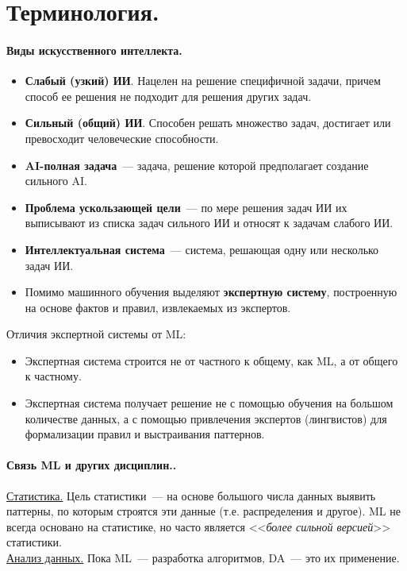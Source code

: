 \documentclass{article}
\begin{document}
    \section{Терминология.}
    \paragraph{Виды искусственного интеллекта.}
    \begin{itemize}
        \item \textbf{Слабый (узкий) ИИ}. Нацелен на решение специфичной задачи, причем способ ее решения не подходит для решения других задач.
        \item \textbf{Сильный (общий) ИИ}. Способен решать множество задач, достигает или превосходит человеческие способности.
        \item \textbf{AI-полная задача}~--- задача, решение которой предполагает создание сильного AI.
        \item \textbf{Проблема ускользающей цели}~--- по мере решения задач ИИ их выписывают из списка задач сильного ИИ и относят к задачам слабого ИИ.
        \item\textbf{Интеллектуальная система}~--- система, решающая одну или несколько задач ИИ.
        \item Помимо машинного обучения выделяют \textbf{экспертную систему}, построенную на основе фактов и правил, извлекаемых из экспертов.
    \end{itemize}
    Отличия экспертной системы от ML:
    \begin{itemize}
        \item Экспертная система строится не от частного к общему, как ML, а от общего к частному.
        \item Экспертная система получает решение не с помощью обучения на большом количестве данных, а с помощью привлечения экспертов (лингвистов) для формализации правил и выстраивания паттернов.
    \end{itemize}
    \paragraph{Связь ML и других дисциплин..}
    \underline{Статистика.} Цель статистики~--- на основе большого числа данных выявить паттерны, по которым строятся эти данные (т.е. распределения и другое). ML не всегда основано на статистике, но часто является <<\textit{более сильной версией}>> статистики.\\
    \underline{Анализ данных.} Пока ML~--- разработка алгоритмов, DA~--- это их применение.
\end{document}
